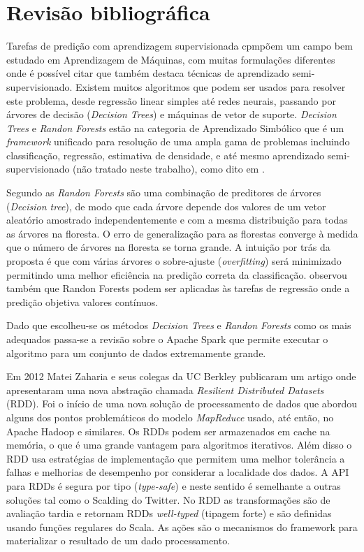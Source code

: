\documentclass[12pt]{article}
\begin{document}
\section{Revisão bibliográfica} 
\label{sec:Revisão bibliográfica}

Tarefas de predição com aprendizagem supervisionada cpmpõem um campo bem estudado em Aprendizagem de Máquinas, com muitas formulações diferentes onde é possível citar \cite{settles2010active} que também destaca técnicas de aprendizado semi-supervisionado.  Existem muitos algoritmos que podem ser usados para resolver este problema, desde regressão linear simples até redes neurais, passando por árvores de decisão (\emph{Decision Trees}) e máquinas de vetor de suporte. \emph{Decision Trees} e \emph{Randon Forests} estão na categoria de Aprendizado Simbólico que é um  \emph{framework} unificado para resolução de uma ampla gama de problemas incluindo classificação, regressão, estimativa de densidade, e até mesmo aprendizado semi-supervisionado (não tratado neste trabalho), como dito em \cite{criminisi2012decision}.  

Segundo \cite{breiman2001random} as \emph{Randon Forests} são uma combinação de preditores de árvores (\emph{Decision tree}), de modo que cada árvore depende dos valores de um vetor aleatório amostrado independentemente e com a mesma distribuição para todas as árvores na floresta. O erro de generalização para as florestas converge à medida que o número de árvores na floresta se torna grande. A intuição por trás da proposta é que com várias árvores o sobre-ajuste (\emph{overfitting}) será minimizado permitindo uma melhor eficiência na predição correta da classificação. \cite{breiman2001random} observou também que Randon Forests podem ser aplicadas às tarefas de regressão onde a predição objetiva valores contínuos.

Dado que escolheu-se os métodos \emph{Decision Trees} e \emph{Randon Forests}  como os mais adequados passa-se a revisão sobre o Apache Spark que permite executar o algoritmo para um conjunto de dados extremamente grande. 

Em 2012 Matei Zaharia e seus colegas da UC Berkley publicaram um artigo \cite{Zaharia2012RDD} onde apresentaram uma nova abstração chamada \emph{Resilient Distributed Datasets} (RDD). Foi o início de uma nova solução de processamento de dados que abordou alguns dos pontos problemáticos do modelo \emph{MapReduce} usado, até então, no Apache Hadoop e similares. Os RDDs podem ser armazenados em cache na memória, o que é uma grande vantagem para algoritmos iterativos. Além disso o RDD usa estratégias de implementação que permitem uma melhor tolerância a falhas e melhorias de desempenho por considerar a localidade dos dados. A API para RDDs é segura por tipo (\emph{type-safe}) e neste sentido é semelhante a outras soluções tal como o Scalding do Twitter. No RDD as transformações são de avaliação tardia e retornam RDDs \emph{well-typed} (tipagem forte) e são definidas usando funções regulares do Scala. As ações são o mecanismos do framework para materializar o resultado de um dado processamento.
\end{document}
